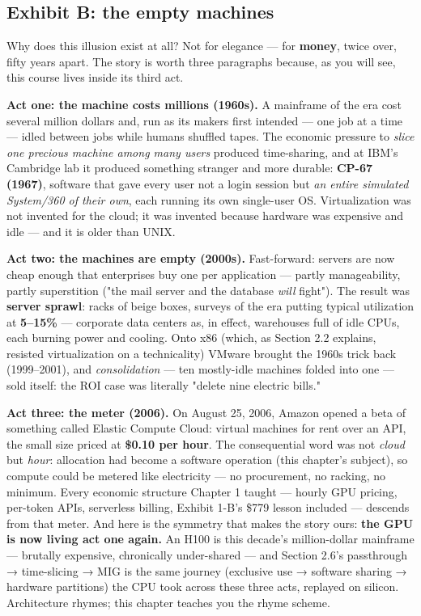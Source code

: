 \subsection*{Exhibit B: the empty machines}

Why does this illusion exist at all? Not for elegance — for \textbf{money}, twice over, fifty years apart. The story is worth three paragraphs because, as you will see, this course lives inside its third act.

\textbf{Act one: the machine costs millions (1960s).} A mainframe of the era cost several million dollars and, run as its makers first intended — one job at a time — idled between jobs while humans shuffled tapes. The economic pressure to \textit{slice one precious machine among many users} produced time-sharing, and at IBM's Cambridge lab it produced something stranger and more durable: \textbf{CP-67 (1967)}, software that gave every user not a login session but \textit{an entire simulated System/360 of their own}, each running its own single-user OS. Virtualization was not invented for the cloud; it was invented because hardware was expensive and idle — and it is older than UNIX.

\textbf{Act two: the machines are empty (2000s).} Fast-forward: servers are now cheap enough that enterprises buy one per application — partly manageability, partly superstition ("the mail server and the database \textit{will} fight"). The result was \textbf{server sprawl}: racks of beige boxes, surveys of the era putting typical utilization at \textbf{5–15\%} — corporate data centers as, in effect, warehouses full of idle CPUs, each burning power and cooling. Onto x86 (which, as Section 2.2 explains, resisted virtualization on a technicality) VMware brought the 1960s trick back (1999–2001), and \textit{consolidation} — ten mostly-idle machines folded into one — sold itself: the ROI case was literally "delete nine electric bills."

\textbf{Act three: the meter (2006).} On August 25, 2006, Amazon opened a beta of something called Elastic Compute Cloud: virtual machines for rent over an API, the small size priced at \textbf{\$0.10 per hour}. The consequential word was not \textit{cloud} but \textit{hour}: allocation had become a software operation (this chapter's subject), so compute could be metered like electricity — no procurement, no racking, no minimum. Every economic structure Chapter 1 taught — hourly GPU pricing, per-token APIs, serverless billing, Exhibit 1-B's \$779 lesson included — descends from that meter. And here is the symmetry that makes the story ours: \textbf{the GPU is now living act one again.} An H100 is this decade's million-dollar mainframe — brutally expensive, chronically under-shared — and Section 2.6's passthrough → time-slicing → MIG is the same journey (exclusive use → software sharing → hardware partitions) the CPU took across these three acts, replayed on silicon. Architecture rhymes; this chapter teaches you the rhyme scheme.

